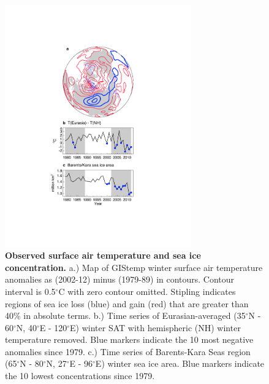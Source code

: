 \documentclass{nature}
\begin{document}
\begin{figure}%
\centering
\noindent\includegraphics[width=19pc]{Word/Figure_1.pdf}
\caption{\textbf{Observed surface air temperature and sea ice concentration.} a.) Map of GIStemp winter surface air temperature anomalies as (2002-12) minus (1979-89) in contours. Contour interval is 0.5$^\circ$C with zero contour omitted. Stipling indicates regions of sea ice loss (blue) and gain (red) that are greater than 40\% in absolute terms. b.) Time series of Eurasian-averaged (35$^\circ$N - 60$^\circ$N, 40$^\circ$E - 120$^\circ$E) winter SAT with hemispheric (NH) winter temperature removed. Blue markers indicate the 10 most negative anomalies since 1979. c.) Time series of Barents-Kara Seas region (65$^\circ$N - 80$^\circ$N, 27$^\circ$E - 96$^\circ$E) winter sea ice area. Blue markers indicate the 10 lowest concentrations since 1979.
}
\label{fig:fig1} 
\end{figure}
\end{document}

